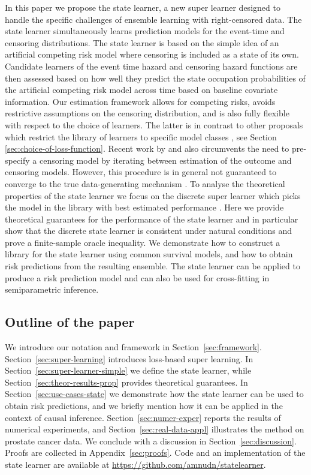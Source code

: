 \documentclass[a4paper,danish]{article}
\theoremstyle{plain} %
\numberwithin{theorem}{section}
\theoremstyle{definition} %
\theoremstyle{remark}
\newcommand{\1}{\mathds{1}}
\begin{document}
In this paper we propose the state learner, a new super learner
designed to handle the specific challenges of ensemble learning with
right-censored data. The state learner simultaneously learns
prediction models for the event-time and censoring distributions. The
state learner is based on the simple idea of an artificial competing
risk model where censoring is included as a state of its
own. Candidate learners of the event time hazard and censoring hazard
functions are then assessed based on how well they predict the state
occupation probabilities of the artificial competing risk model across
time based on baseline covariate information. Our estimation framework
allows for competing risks, avoids restrictive assumptions on the
censoring distribution, and is also fully flexible with respect to the
choice of learners. The latter is in contrast to other proposals which
restrict the library of learners to specific model classes
\citep{polley2011-sl-cens,golmakani2020super}, see Section
\ref{sec:choice-of-loss-function}. Recent work by
\cite{han2021inverse} and \cite{westling2021inference} also
circumvents the need to pre-specify a censoring model by iterating
between estimation of the outcome and censoring models. However, this
procedure is in general not guaranteed to converge to the true
data-generating mechanism \citep[][Appendix~A.4]{munch2024thesis}. To
analyse the theoretical properties of the state learner we focus on
the discrete super learner which picks the model in the library with
best estimated performance \citep{van2007super}. Here we provide
theoretical guarantees for the performance of the state learner and in
particular show that the discrete state learner is consistent under
natural conditions and prove a finite-sample oracle inequality. We
demonstrate how to construct a library for the state learner using
common survival models, and how to obtain risk predictions from the
resulting ensemble.
The state learner can be applied to produce a risk
prediction model and can also be used for cross-fitting in semiparametric inference.

\subsection{Outline of the paper}
\label{sec:outline-paper}

We introduce our notation and framework in
Section~\ref{sec:framework}. Section~\ref{sec:super-learning}
introduces loss-based super learning. In
Section~\ref{sec:super-learner-simple} we define the state learner,
while Section~\ref{sec:theor-results-prop} provides theoretical
guarantees. In Section~\ref{sec:use-cases-state} we demonstrate how
the state learner can be used to obtain risk predictions, and we
briefly mention how it can be applied in the context of causal
inference.  Section~\ref{sec:numer-exper} reports the results of
numerical experiments, and Section~\ref{sec:real-data-appl}
illustrates the method on prostate cancer data. We conclude with a
discussion in Section~\ref{sec:discussion}. Proofs are collected in
Appendix~\ref{sec:proofs}. Code and an implementation of the state
learner are available at \url{https://github.com/amnudn/statelearner}.
\end{document}
